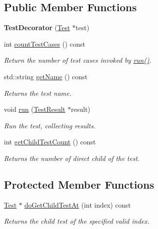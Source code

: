 \subsection*{Public Member Functions}
\begin{DoxyCompactItemize}
\item 
{\bfseries Test\+Decorator} (\hyperlink{class_test}{Test} $\ast$test)\hypertarget{class_test_decorator_a227e67c84146b23a37b44c24877b45d9}{}\label{class_test_decorator_a227e67c84146b23a37b44c24877b45d9}

\item 
int \hyperlink{class_test_decorator_add3b489dfb3331eba0aee7e06b03548b}{count\+Test\+Cases} () const 
\begin{DoxyCompactList}\small\item\em Return the number of test cases invoked by \hyperlink{class_test_decorator_a64dd70aae76f31f2e2f7b5ac84a8e829}{run()}. \end{DoxyCompactList}\item 
std\+::string \hyperlink{class_test_decorator_acdcf679bba926032d2e4535fca1e9cf0}{get\+Name} () const 
\begin{DoxyCompactList}\small\item\em Returns the test name. \end{DoxyCompactList}\item 
void \hyperlink{class_test_decorator_a64dd70aae76f31f2e2f7b5ac84a8e829}{run} (\hyperlink{class_test_result}{Test\+Result} $\ast$result)\hypertarget{class_test_decorator_a64dd70aae76f31f2e2f7b5ac84a8e829}{}\label{class_test_decorator_a64dd70aae76f31f2e2f7b5ac84a8e829}

\begin{DoxyCompactList}\small\item\em Run the test, collecting results. \end{DoxyCompactList}\item 
int \hyperlink{class_test_decorator_aa2fbf0467c6bd599f912415a097e087c}{get\+Child\+Test\+Count} () const \hypertarget{class_test_decorator_aa2fbf0467c6bd599f912415a097e087c}{}\label{class_test_decorator_aa2fbf0467c6bd599f912415a097e087c}

\begin{DoxyCompactList}\small\item\em Returns the number of direct child of the test. \end{DoxyCompactList}\end{DoxyCompactItemize}
\subsection*{Protected Member Functions}
\begin{DoxyCompactItemize}
\item 
\hyperlink{class_test}{Test} $\ast$ \hyperlink{class_test_decorator_a029da80376365525d52387a88e6837f4}{do\+Get\+Child\+Test\+At} (int index) const 
\begin{DoxyCompactList}\small\item\em Returns the child test of the specified valid index. \end{DoxyCompactList}\end{DoxyCompactItemize}
